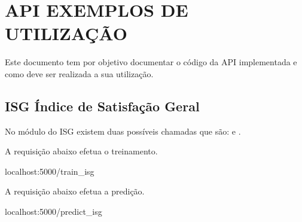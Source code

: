 \documentclass[letterpaper,10pt,english]{sphinxmanual}
\begin{document}
\section{API \sphinxhyphen{} EXEMPLOS DE UTILIZAÇÃO}
\label{\detokenize{examples:api-exemplos-de-utilizacao}}\label{\detokenize{examples::doc}}
\sphinxAtStartPar
Este documento tem por objetivo documentar o código da API implementada
e como deve ser realizada a sua utilização.


\subsection{ISG \sphinxhyphen{} Índice de Satisfação Geral}
\label{\detokenize{examples:isg-indice-de-satisfacao-geral}}
\sphinxAtStartPar
No módulo do ISG existem duas possíveis chamadas que são:
 e .

\sphinxAtStartPar
{}

\sphinxAtStartPar
A requisição abaixo efetua o treinamento.

\sphinxAtStartPar
{} localhost:5000/train\_isg

\sphinxAtStartPar
{}
\begin{quote}

\sphinxAtStartPar
{}
\end{quote}

\sphinxAtStartPar
{}

\sphinxAtStartPar
A requisição abaixo efetua a predição.

\sphinxAtStartPar
{} localhost:5000/predict\_isg

\sphinxAtStartPar
{}

\begin{sphinxVerbatim}[commandchars=\\\{\}]
     \PYG{p}{[}
             
             

             
             

             
             

    \PYG{p}{]}
\end{sphinxVerbatim}
\end{document}
